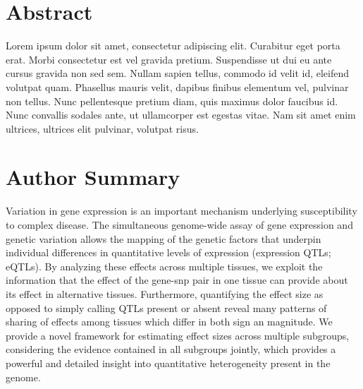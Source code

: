 \documentclass[10pt,letterpaper]{article}
\begin{document}
\section*{Abstract}
Lorem ipsum dolor sit amet, consectetur adipiscing elit. Curabitur eget porta erat. Morbi consectetur est vel gravida pretium. Suspendisse ut dui eu ante cursus gravida non sed sem. Nullam sapien tellus, commodo id velit id, eleifend volutpat quam. Phasellus mauris velit, dapibus finibus elementum vel, pulvinar non tellus. Nunc pellentesque pretium diam, quis maximus dolor faucibus id. Nunc convallis sodales ante, ut ullamcorper est egestas vitae. Nam sit amet enim ultrices, ultrices elit pulvinar, volutpat risus.


\section*{Author Summary}
Variation in gene expression is an important mechanism underlying susceptibility to complex disease.  The simultaneous genome-wide assay of gene expression and genetic variation allows the mapping of the genetic factors that underpin individual differences in quantitative levels of expression (expression QTLs; eQTLs). 
By analyzing these effects across multiple tissues, we exploit the information that the effect of the gene-snp pair in one tissue can provide about its effect in alternative tissues.
Furthermore, quantifying the effect size as opposed to simply calling QTLs present or absent reveal many patterns of sharing of effects among tissues which differ in both sign an magnitude.
We provide a novel framework for estimating effect sizes across multiple subgroups, considering the evidence contained in all subgroups jointly, which provides a powerful and detailed insight into quantitative heterogeneity present in the genome.
\end{document}
